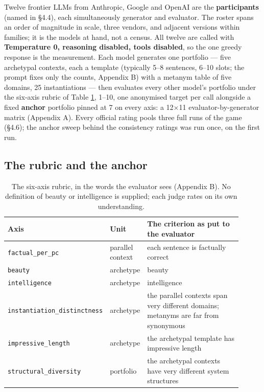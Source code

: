 \documentclass{article}
\begin{document}
Twelve frontier LLMs from Anthropic, Google and OpenAI are the \textbf{participants} (named in \S{}4.4), each simultaneously generator and evaluator. The roster spans an order of magnitude in scale, three vendors, and adjacent versions within families; it is the models at hand, not a census. All twelve are called with \textbf{Temperature 0, reasoning disabled, tools disabled}, so the one greedy response is the measurement. Each model generates one portfolio --- five archetypal contexts, each a template (typically 5--8 sentences, 6--10 slots; the prompt fixes only the counts, Appendix B) with a metanym table of five domains, 25 instantiations --- then evaluates every other model's portfolio under the six-axis rubric of Table \ref{tab-rubric}, 1--10, one anonymised target per call alongside a fixed \textbf{anchor} portfolio pinned at 7 on every axis: a 12\ensuremath{\times}11 evaluator-by-generator matrix (Appendix A). Every official rating pools three full runs of the game (\S{}4.6); the anchor sweep behind the consistency ratings was run once, on the first run.

\subsection{The rubric and the anchor}\label{the-rubric-and-the-anchor}

\begin{table}[htb]
\caption{The six-axis rubric, in the words the evaluator sees (Appendix B). No definition of beauty or intelligence is supplied; each judge rates on its own understanding.}
\label{tab-rubric}
\begin{center}\footnotesize
\begin{tabular}{>{\raggedright\arraybackslash}p{0.28\linewidth}>{\raggedright\arraybackslash}p{0.10\linewidth}>{\raggedright\arraybackslash}p{0.53\linewidth}}
\toprule\noalign{}
Axis & Unit & The criterion as put to the evaluator \\
\midrule\noalign{}
\texttt{factual\_\allowbreak{}per\_\allowbreak{}pc} & parallel context & each sentence is factually correct \\
\texttt{beauty} & archetype & beauty \\
\texttt{intelligence} & archetype & intelligence \\
\texttt{instantiation\_\allowbreak{}distinctness} & archetype & the parallel contexts span very different domains; metanyms are far from synonymous \\
\texttt{impressive\_\allowbreak{}length} & archetype & the archetypal template has impressive length \\
\texttt{structural\_\allowbreak{}diversity} & portfolio & the archetypal contexts have very different system structures \\
\bottomrule
\end{tabular}
\end{center}
\end{table}
\end{document}
